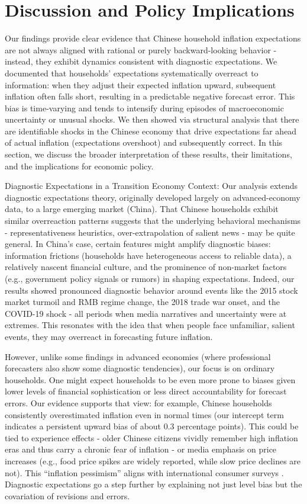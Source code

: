 \documentclass[12pt]{article}
\begin{document}
\section{Discussion and Policy Implications}\label{sec:discussion}
Our findings provide clear evidence that Chinese household inflation expectations are not always aligned with rational or purely backward-looking behavior - instead, they exhibit dynamics consistent with diagnostic expectations. We documented that households' expectations systematically overreact to information: when they adjust their expected inflation upward, subsequent inflation often falls short, resulting in a predictable negative forecast error. This bias is time-varying and tends to intensify during episodes of macroeconomic uncertainty or unusual shocks. We then showed via structural analysis that there are identifiable shocks in the Chinese economy that drive expectations far ahead of actual inflation (expectations overshoot) and subsequently correct. In this section, we discuss the broader interpretation of these results, their limitations, and the implications for economic policy.

Diagnostic Expectations in a Transition Economy Context: Our analysis extends diagnostic expectations theory, originally developed largely on advanced-economy data, to a large emerging market (China). That Chinese households exhibit similar overreaction patterns suggests that the underlying behavioral mechanisms - representativeness heuristics, over-extrapolation of salient news - may be quite general. In China's case, certain features might amplify diagnostic biases: information frictions (households have heterogeneous access to reliable data), a relatively nascent financial culture, and the prominence of non-market factors (e.g., government policy signals or rumors) in shaping expectations. Indeed, our results showed pronounced diagnostic behavior around events like the 2015 stock market turmoil and RMB regime change, the 2018 trade war onset, and the COVID-19 shock - all periods when media narratives and uncertainty were at extremes. This resonates with the idea that when people face unfamiliar, salient events, they may overreact in forecasting future inflation.

However, unlike some findings in advanced economies (where professional forecasters also show some diagnostic tendencies), our focus is on ordinary households. One might expect households to be even more prone to biases given lower levels of financial sophistication or less direct accountability for forecast errors. Our evidence supports that view: for example, Chinese households consistently overestimated inflation even in normal times (our intercept term indicates a persistent upward bias of about 0.3 percentage points). This could be tied to experience effects - older Chinese citizens vividly remember high inflation eras and thus carry a chronic fear of inflation \cite{Malmendier2016} - or media emphasis on price increases (e.g., food price spikes are widely reported, while slow price declines are not). This “inflation pessimism” aligns with international consumer surveys \cite{BruineDeBruin2010}. Diagnostic expectations go a step further by explaining not just level bias but the covariation of revisions and errors.
\end{document}
